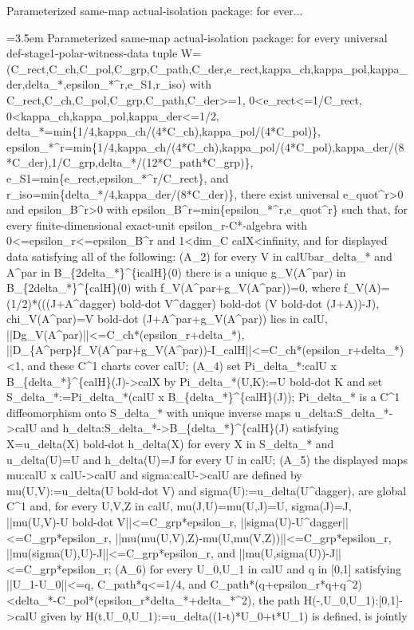 \documentclass{article}
\newcommand{\step}[1]{\par\noindent\hangindent=3.5em\hangafter=1%
  \makebox[3.5em][l]{\textbf{#1.}}}
\begin{document}
\begin{proofbox}{Parameterized same-map actual-isolation package: for ever...}
\step{1} Parameterized same-map actual-isolation package: for every universal def-stage1-polar-witness-data tuple W=(C\_rect,C\_ch,C\_pol,C\_grp,C\_path,C\_der,e\_rect,kappa\_ch,kappa\_pol,kappa\_der,delta\_*,epsilon\_*\textasciicircum{}r,e\_S1,r\_iso) with C\_rect,C\_ch,C\_pol,C\_grp,C\_path,C\_der>=1, 0<e\_rect<=1/C\_rect, 0<kappa\_ch,kappa\_pol,kappa\_der<=1/2, delta\_*=min\{1/4,kappa\_ch/(4*C\_ch),kappa\_pol/(4*C\_pol)\}, epsilon\_*\textasciicircum{}r=min\{1/4,kappa\_ch/(4*C\_ch),kappa\_pol/(4*C\_pol),kappa\_der/(8*C\_der),1/C\_grp,delta\_*/(12*C\_path*C\_grp)\}, e\_S1=min\{e\_rect,epsilon\_*\textasciicircum{}r/C\_rect\}, and r\_iso=min\{delta\_*/4,kappa\_der/(8*C\_der)\}, there exist universal e\_quot\textasciicircum{}r>0 and epsilon\_B\textasciicircum{}r>0 with epsilon\_B\textasciicircum{}r=min\{epsilon\_*\textasciicircum{}r,e\_quot\textasciicircum{}r\} such that, for every finite-dimensional exact-unit epsilon\_r-C*-algebra with 0<=epsilon\_r<=epsilon\_B\textasciicircum{}r and 1<dim\_C calX<infinity, and for displayed data satisfying all of the following: (A\_2) for every V in calUbar\_delta\_* and A\textasciicircum{}par in B\_\{2delta\_*\}\textasciicircum{}\{icalH\}(0) there is a unique g\_V(A\textasciicircum{}par) in B\_\{2delta\_*\}\textasciicircum{}\{calH\}(0) with f\_V(A\textasciicircum{}par+g\_V(A\textasciicircum{}par))=0, where f\_V(A)=(1/2)*(((J+A\textasciicircum{}dagger) bold-dot V\textasciicircum{}dagger) bold-dot (V bold-dot (J+A))-J), chi\_V(A\textasciicircum{}par)=V bold-dot (J+A\textasciicircum{}par+g\_V(A\textasciicircum{}par)) lies in calU, ||Dg\_V(A\textasciicircum{}par)||<=C\_ch*(epsilon\_r+delta\_*), ||D\_\{A\textasciicircum{}perp\}f\_V(A\textasciicircum{}par+g\_V(A\textasciicircum{}par))-I\_calH||<=C\_ch*(epsilon\_r+delta\_*)<1, and these C\textasciicircum{}1 charts cover calU; (A\_4) set Pi\_delta\_*:calU x B\_\{delta\_*\}\textasciicircum{}\{calH\}(J)->calX by Pi\_delta\_*(U,K):=U bold-dot K and set S\_delta\_*:=Pi\_delta\_*(calU x B\_\{delta\_*\}\textasciicircum{}\{calH\}(J)); Pi\_delta\_* is a C\textasciicircum{}1 diffeomorphism onto S\_delta\_* with unique inverse maps u\_delta:S\_delta\_*->calU and h\_delta:S\_delta\_*->B\_\{delta\_*\}\textasciicircum{}\{calH\}(J) satisfying X=u\_delta(X) bold-dot h\_delta(X) for every X in S\_delta\_* and u\_delta(U)=U and h\_delta(U)=J for every U in calU; (A\_5) the displayed maps mu:calU x calU->calU and sigma:calU->calU are defined by mu(U,V):=u\_delta(U bold-dot V) and sigma(U):=u\_delta(U\textasciicircum{}dagger), are global C\textasciicircum{}1 and, for every U,V,Z in calU, mu(J,U)=mu(U,J)=U, sigma(J)=J, ||mu(U,V)-U bold-dot V||<=C\_grp*epsilon\_r, ||sigma(U)-U\textasciicircum{}dagger||<=C\_grp*epsilon\_r, ||mu(mu(U,V),Z)-mu(U,mu(V,Z))||<=C\_grp*epsilon\_r, ||mu(sigma(U),U)-J||<=C\_grp*epsilon\_r, and ||mu(U,sigma(U))-J||<=C\_grp*epsilon\_r; (A\_6) for every U\_0,U\_1 in calU and q in [0,1] satisfying ||U\_1-U\_0||<=q, C\_path*q<=1/4, and C\_path*(q+epsilon\_r*q+q\textasciicircum{}2)<delta\_*-C\_pol*(epsilon\_r*delta\_*+delta\_*\textasciicircum{}2), the path H(-,U\_0,U\_1):[0,1]->calU given by H(t,U\_0,U\_1):=u\_delta((1-t)*U\_0+t*U\_1) is defined, is jointly 
\end{proofbox}
\end{document}
